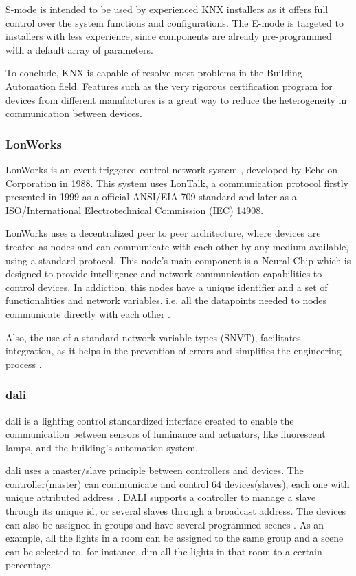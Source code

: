  S-mode is intended to be used by experienced KNX installers as it offers full control over the system functions and configurations. The E-mode is targeted to installers with less experience, since components are already pre-programmed with a default array of parameters.
 
To conclude, KNX is capable of resolve most problems in the Building Automation field. Features such as the very rigorous certification program for devices from different manufactures is a great way to reduce the heterogeneity in communication between devices.

 
\subsubsection{LonWorks}

LonWorks is an event-triggered control network system \cite{Osorio}, developed by Echelon Corporation \cite{echelon} in 1988. This system uses LonTalk, a communication protocol firstly presented in 1999 as a official ANSI/EIA-709 standard and later as a ISO/International Electrotechnical Commission (IEC) 14908.

LonWorks uses a decentralized peer to peer architecture, where devices are treated as nodes and can communicate with each other by any medium available, using a standard protocol. This node's main component is a Neural Chip which is designed to provide intelligence and network communication capabilities to control devices. In addiction, this nodes have a unique identifier and a set of functionalities and network variables, i.e. all the datapoints needed to nodes communicate directly with each other \cite{Domingues2016}.

Also, the use of a standard network variable types (SNVT), facilitates integration, as it helps in the prevention of errors and simplifies the engineering process \cite{Siemens2013}. 


\subsubsection{\acf{dali}}
\acf{dali} is a lighting control standardized interface created to enable the communication between sensors of luminance and actuators, like fluorescent lamps, and the building's automation system.

\ac{dali} uses a master/slave principle between controllers and devices. The controller(master) can communicate and control 64 devices(slaves), each one with unique attributed address \cite{Ma2014}. DALI supports a controller to manage a slave through its unique id, or several slaves through a broadcast address. The devices can also be assigned in groups and have several programmed scenes \cite{Ma2014}. As an example, all the lights in a room can be assigned to the same group and a scene can be selected to, for instance, dim all the lights in that room to a certain percentage. 

